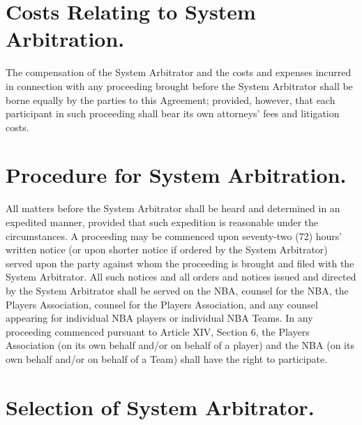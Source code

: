 \documentclass[
]{book}
\begin{document}
\hypertarget{costs-relating-to-system-arbitration.}{%
\section{Costs Relating to System Arbitration.}\label{costs-relating-to-system-arbitration.}}

The compensation of the System Arbitrator and the costs and expenses incurred in connection with any proceeding brought before the System Arbitrator shall be borne equally by the parties to this Agreement; provided, however, that each participant in such proceeding shall bear its own attorneys' fees and litigation costs.

\hypertarget{procedure-for-system-arbitration.}{%
\section{Procedure for System Arbitration.}\label{procedure-for-system-arbitration.}}

All matters before the System Arbitrator shall be heard and determined in an expedited manner, provided that such expedition is reasonable under the circumstances. A proceeding may be commenced upon seventy-two (72) hours' written notice (or upon shorter notice if ordered by the System Arbitrator) served upon the party against whom the proceeding is brought and filed with the System Arbitrator. All such notices and all orders and notices issued and directed by the System Arbitrator shall be served on the NBA, counsel for the NBA, the Players Association, counsel for the Players Association, and any counsel appearing for individual NBA players or individual NBA Teams. In any proceeding commenced pursuant to Article XIV, Section 6, the Players Association (on its own behalf and/or on behalf of a player) and the NBA (on its own behalf and/or on behalf of a Team) shall have the right to participate.

\hypertarget{selection-of-system-arbitrator.}{%
\section{Selection of System Arbitrator.}\label{selection-of-system-arbitrator.}}
\end{document}
